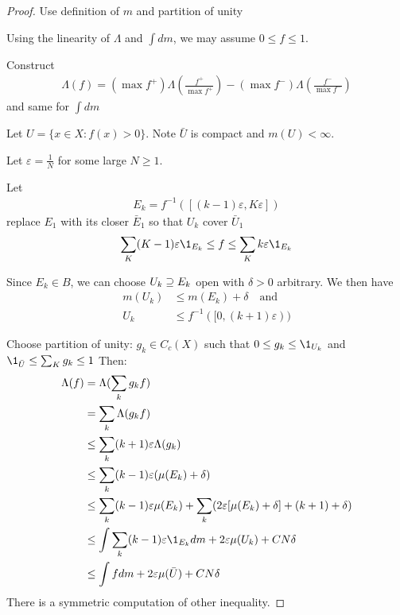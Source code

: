 \begin{proof}
	Use definition of $m$ and partition of unity

	Using the linearity of $\Lambda$ and  $\int dm$, we may assume $0 \leq f \leq 1.$

	Construct 
	 \begin{align*}
	    \Lambda (f) = ( \max f^+ ) \Lambda \left(\frac{f^+}{\max f^+}\right) - (\max f^- ) \Lambda \left(\frac{f^-}{\max f^-} \right)
	\end{align*} 
	and same for $\int dm$


	Let $U = \{x \in X : f(x) > 0\}$. Note  $\bar{U}$ is compact and $m(U) < \infty$.

	Let  $\varepsilon = \frac{1}{N}$ for some large  $N \geq 1$.

	Let
	\begin{align*}
		E_k = f^{-1}\left( [ (k-1) \varepsilon, K \varepsilon]\right)
	\end{align*}
	replace $E_1$ with its closer $\bar{E}_1$ so that $U_k$ cover $\bar{U}_1$
	 \begin{align*}
	\sum_{K} (K -1) \varepsilon \1_{E_k} \leq f \leq \sum_{K} k \varepsilon \1_{E_k}
	\end{align*} 

	Since $E_k \in B$, we can choose $U_k \supseteq E_k$ open with $\delta >0 $ arbitrary.
	We then have
	\begin{align*}
		m(U_k) &\leq m(E_k) + \delta \quad \text{and} \\
		U_k &\leq f^{-1} ( [ 0, (k+1)\varepsilon))
	\end{align*} 

	Choose partition of unity: $g_k \in C_c(X)$ such that  $0 \leq g_k \leq \1_{U_k}$ and \\
	$\1_{\bar{U}} \leq \sum_{K} g_k \leq 1$ 
	Then:
	\begin{align*}
	\Lambda(f) &= \Lambda( \sum_{k} g_k f) \\
			   &=  \sum_{k} \Lambda( g_k f) \\
			   &\leq  \sum_{k} (k+1) \varepsilon \Lambda( g_k ) \\
			   &\leq  \sum_{k} (k-1) \varepsilon ( \mu( E_k ) + \delta ) \\
			   &\leq \sum_{k} (k-1) \varepsilon \mu( E_k ) + \sum_{k} (2 \varepsilon [ \mu (E_k) + \delta] + (k+1) + \delta) \\
			   &\leq \int \sum_{k} (k-1) \varepsilon \1_{E_k} dm + 2 \varepsilon  \mu( U_k ) + C N \delta  \\
			   &\leq \int f dm + 2 \varepsilon  \mu(\bar{U}) + C N \delta  \\
	\end{align*} There is a symmetric computation of other inequality.
\end{proof}





